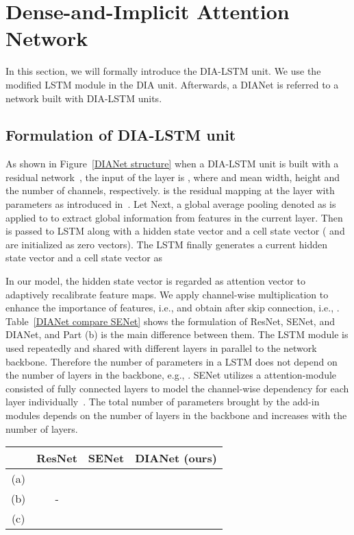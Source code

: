 \documentclass[letterpaper]{article} \usepackage{aaai20}  \usepackage{times}  \usepackage{helvet} \usepackage{courier}  \usepackage[hyphens]{url}  \usepackage{graphicx} \urlstyle{rm} \def\UrlFont{\rm}  \usepackage{graphicx}  \frenchspacing  \setlength{\pdfpagewidth}{8.5in}  \setlength{\pdfpageheight}{11in}  \usepackage{color}
\begin{document}
	\section{Dense-and-Implicit Attention Network}
	\label{DIA}
	In this section, we will formally introduce the DIA-LSTM unit. We use the modified LSTM module in the DIA unit. Afterwards, a DIANet is referred to a network built with DIA-LSTM units. 
	\subsection{Formulation of DIA-LSTM unit}\label{subsec:Formulation of DIANet}
    As shown in Figure~\ref{DIANet structure} when a DIA-LSTM unit is built with a residual network~\cite{he2016deep}, the input of the  layer is , where  and  mean width, height and the number of channels, respectively.  is the residual mapping  at the  layer with parameters  as introduced in~\cite{he2016deep}. Let  Next, a global average pooling denoted as  is applied to  to extract global information from features in the current layer. Then  is passed to LSTM along with a hidden state vector  and a cell state vector  (  and  are initialized as zero vectors). The LSTM finally generates a current hidden state vector  and a cell state vector  as
	
	 In our model, the hidden state vector  is regarded as attention vector to adaptively recalibrate feature maps. We apply channel-wise multiplication  to enhance the importance of features, i.e.,  and obtain  after skip connection, i.e., . Table~\ref{DIANet compare SENet} shows the formulation of ResNet, SENet, and DIANet, and Part (b) is the main difference between them. The LSTM module is used repeatedly and shared with different layers in parallel to the network backbone. Therefore the number of parameters  in a LSTM does not depend on the number of layers in the backbone, e.g., . SENet utilizes a attention-module consisted of fully connected layers to model the channel-wise dependency for each layer individually~\cite{hu2018squeeze}. The total number of parameters brought by the add-in modules depends on the number of layers in the backbone and increases with the number of layers. 
	\begin{table*}[htbp]
		\small
		\centering
		\begin{tabular}{|c|c|c|c|}
			\toprule
			&    ResNet   &  SENet     & DIANet (ours) \\
			\midrule
			(a)  &   &  &   \\
			(b)  &    -   &       &  \\
			(c) &       &       &  \\
			\bottomrule
		\end{tabular}\caption{Formulation for the structure of ResNet, SENet, and DIANet.  is the convolution layer.  means fully connected layer and  indicates global average pooling. }
		\label{DIANet compare SENet}\end{table*}
\end{document}
